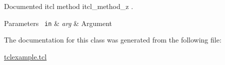 Documented itcl method {\ttfamily itcl\+\_\+method\+\_\+z} . 


\begin{DoxyParams}[1]{Parameters}
\mbox{\texttt{ in}}  & {\em arg} & Argument \\
\hline
\end{DoxyParams}

\begin{DoxyCode}{0}

\end{DoxyCode}


The documentation for this class was generated from the following file\+:\begin{DoxyCompactItemize}
\item 
\mbox{\hyperlink{tclexample_8tcl}{tclexample.\+tcl}}\end{DoxyCompactItemize}
